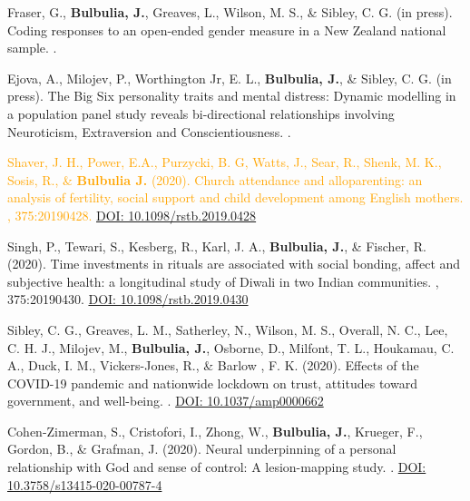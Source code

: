 \documentclass{article}
\begin{document}
\begin{thebibliography}{99}
 Fraser, G., {\bf Bulbulia, J.}, Greaves, L., Wilson, M. S., \& Sibley, C. G. (in press). 
\newblock Coding responses to an open-ended gender measure in a New Zealand national sample.
. 


 Ejova, A., Milojev, P., Worthington Jr, E. L., {\bf Bulbulia, J.}, \& Sibley, C. G. (in press). 
\newblock The Big Six personality traits and mental distress: Dynamic modelling in a population panel study reveals bi-directional relationships involving Neuroticism, Extraversion and Conscientiousness.
. 



 \textcolor{Orange}{Shaver, J. H., Power, E.A., Purzycki, B. G, Watts, J., Sear, R., Shenk, M. K., Sosis, R., \& {\bf Bulbulia J.} (2020). 
\newblock Church attendance and alloparenting: an analysis of fertility, social support and child development among English mothers. 
, 375:20190428.
\href{http://dx.doi.org/10.1098/rstb.2019.0428}{DOI: 10.1098/rstb.2019.0428}}


 Singh, P., Tewari, S., Kesberg, R., Karl, J. A., {\bf Bulbulia, J.}, \& Fischer, R. (2020). 
\newblock Time investments in rituals are associated with social bonding, affect and subjective health: a longitudinal study of Diwali in two Indian communities. 
, 375:20190430.
\href{http://dx.doi.org/10.1098/rstb.2019.0430}{DOI: 10.1098/rstb.2019.0430}


 Sibley, C. G., Greaves, L. M., Satherley, N., Wilson, M. S., Overall, N. C., Lee, C. H. J., Milojev, M., {\bf Bulbulia, J.}, Osborne, D., Milfont, T. L., Houkamau, C. A., Duck, I. M., Vickers-Jones, R., \& Barlow , F. K. (2020).
\newblock Effects of the COVID-19 pandemic and nationwide lockdown on trust, attitudes toward government, and well-being. 
.
\href{http://dx.doi.org/10.1037/amp0000662}{DOI: 10.1037/amp0000662}


 Cohen-Zimerman, S., Cristofori, I., Zhong, W., {\bf Bulbulia, J.}, Krueger, F., Gordon, B., \& Grafman, J. (2020).
\newblock Neural underpinning of a personal relationship with God and sense of control: A lesion-mapping study.
.
\href{https://doi.org/10.3758/s13415-020-00787-4}{DOI: 10.3758/s13415-020-00787-4}



\end{thebibliography}
\end{document}
